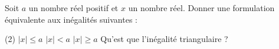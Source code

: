 %
%
	Soit $a$ un nombre réel positif et $x$ un nombre réel. Donner une formulation équivalente aux inégalités suivantes :
	\begin{tasks}(2)
		\task $\mid x \mid \leqslant a$
		\task $\mid x \mid < a$
		\task $\mid x \mid \geqslant a$
		\task Qu'est que l'inégalité triangulaire ?
	\end{tasks}
	
